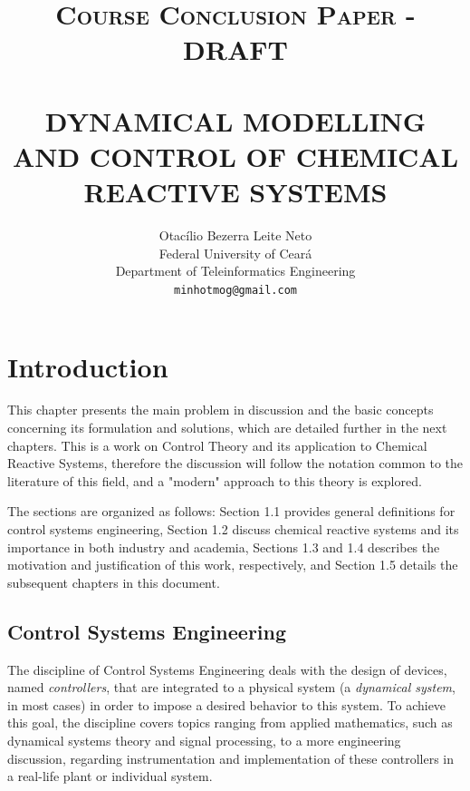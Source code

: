 \documentclass[a4paper,11pt]{book}
\title{ \normalsize \textsc{Course Conclusion Paper - DRAFT} 
        \\[2.0cm]             
        \HRule{0.5pt} \\              
        \LARGE \textbf{\uppercase{Dynamical Modelling and Control of Chemical Reactive Systems}}
        \HRule{2pt} \\[0.5cm]  
}
\author{
        Otacílio Bezerra Leite Neto\\   
        Federal University of Ceará\\  
        Department of Teleinformatics Engineering\\
        \texttt{minhotmog@gmail.com} \\
}
\makeatletter
\numberwithin{figure}{chapter}
\numberwithin{equation}{chapter}
\numberwithin{table}{chapter}
\theoremstyle{definition}
\def\printtitle{
    {\centering \@title\par}}
\def\printauthor{
    {\centering \large \@author}}
\makeatother
\begin{document}
\thispagestyle{empty}       %

\printtitle                 %
    \vfill
\printauthor                %
\newpage

\thispagestyle{empty}   
\tableofcontents

\clearpage
\setcounter{page}{1}
\chapter{Introduction}

This chapter presents the main problem in discussion and the basic concepts concerning its formulation and solutions, which are detailed further in the next chapters. This is a work on Control Theory and its application to Chemical Reactive Systems, therefore the discussion will follow the notation common to the literature of this field, and a "modern" approach to this theory is explored. 

The sections are organized as follows: Section 1.1 provides general definitions for control systems engineering, Section 1.2 discuss chemical reactive systems and its importance in both industry and academia, Sections 1.3 and 1.4 describes the motivation and justification of this work, respectively, and Section 1.5 details the subsequent chapters in this document.

\section{Control Systems Engineering}

The discipline of Control Systems Engineering deals with the design of devices, named \textit{controllers}, that are integrated to a physical system (a \textit{dynamical system}, in most cases) in order to impose a desired behavior to this system. To achieve this goal, the discipline covers topics ranging from applied mathematics, such as dynamical systems theory and signal processing, to a more engineering discussion, regarding instrumentation and implementation of these controllers in a real-life plant or individual system. 
\end{document}
